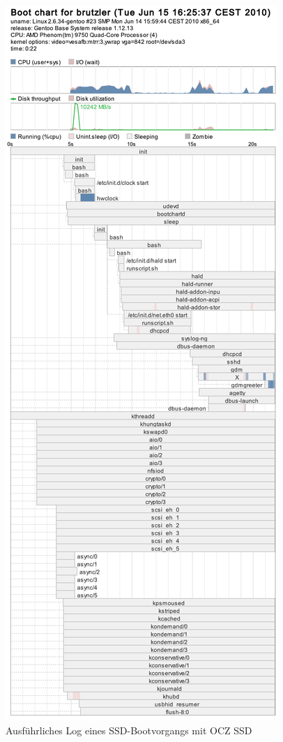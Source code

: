 \begin{figure}[H]\centering
	\includegraphics[scale=0.4]{figures/appendix/bootchart-ssd}
    \caption{Ausführliches Log eines SSD-Bootvorgangs mit OCZ SSD}
    \label{img:bootchart-ssd}
\end{figure}

